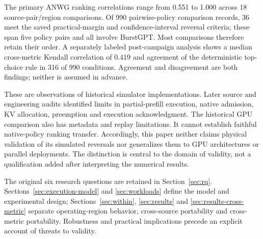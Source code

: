 The primary ANWG ranking correlations range from 0.551 to 1.000 across 18
source-pair/region comparisons. Of 990 pairwise-policy comparison records,
36 meet the saved practical-margin and confidence-interval reversal criteria;
these span five policy pairs and all involve BurstGPT. Most comparisons
therefore retain their order. A separately labeled post-campaign analysis
shows a median cross-metric Kendall correlation of 0.419 and agreement of
the deterministic top-choice rule in 316 of 990 conditions. Agreement
and disagreement are both findings; neither is assumed in advance.

These are observations of historical simulator implementations. Later
source and engineering audits identified limits in partial-prefill
execution, native admission, KV allocation, preemption and execution
acknowledgment. The historical GPU comparison also has metadata and replay
limitations. It cannot establish faithful native-policy ranking transfer.
Accordingly, this paper neither claims physical validation of its simulated
reversals nor generalizes them to GPU architectures or parallel deployments.
The distinction is central to the domain of validity, not a qualification
added after interpreting the numerical results.

The original six research questions are retained in
Section~\ref{sec:rq}. Sections~\ref{sec:execution-model} and
\ref{sec:workloads} define the model and experimental design;
Sections~\ref{sec:within}, \ref{sec:results} and
\ref{sec:results-cross-metric} separate operating-region behavior,
cross-source portability and cross-metric portability. Robustness and
practical implications precede an explicit account of threats to validity.
